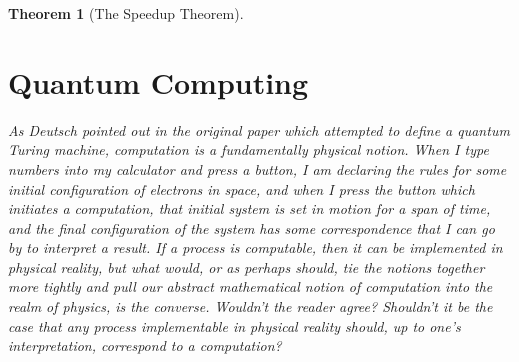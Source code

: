 \documentclass{article}
\theoremstyle{definition}
\theoremstyle{plain}
\theoremstyle{theorem}
\newtheorem{theorem}{Theorem}[section]
\begin{document}
\begin{theorem}[The Speedup Theorem]
\section{Quantum Computing}
As Deutsch pointed out in the original paper which attempted to define a quantum Turing machine, computation is a fundamentally physical notion. When I type numbers into my calculator and press a button, I am declaring the rules for some initial configuration of electrons in space, and when I press the button which initiates a computation, that initial system is set in motion for a span of time, and the final configuration of the system has some correspondence that I can go by to interpret a result. If a process is computable, then it can be implemented in physical reality, but what would, or as perhaps \textit{should}, tie the notions together more tightly and pull our abstract mathematical notion of computation into the realm of physics, is the converse. Wouldn't the reader agree? Shouldn't it be the case that any process implementable in physical reality should, up to one's interpretation, correspond to a computation? 

\end{theorem}
\end{document}
